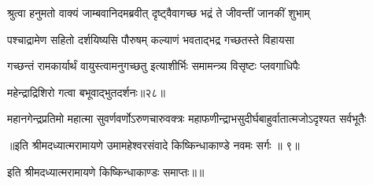\twolineshloka
{श्रुत्वा हनुमतो वाक्यं जाम्बवानिदमब्रवीत्}
{दृष्ट्वैवागच्छ भद्रं ते जीवन्तीं जानकीं शुभाम्} %

\twolineshloka
{पश्चाद्रामेण सहितो दर्शयिष्यसि पौरुषम्}
{कल्याणं भवताद्भद्र गच्छतस्ते विहायसा} %

\twolineshloka
{गच्छन्तं रामकार्यार्थं वायुस्त्वामनुगच्छतु}
{इत्याशीर्भिः समामन्त्र्य विसृष्टः प्लवगाधिपैः} %

{महेन्द्राद्रिशिरो गत्वा बभूवाद्भुतदर्शनः॥२८॥} %


\twolineshloka
{महानगेन्द्रप्रतिमो महात्मा सुवर्णवर्णोऽरुणचारुवक्त्रः}
{महाफणीन्द्राभसुदीर्घबाहुर्वातात्मजोऽदृश्यत सर्वभूतैः} %

{॥इति श्रीमदध्यात्मरामायणे उमामहेश्वरसंवादे किष्किन्धाकाण्डे
नवमः सर्गः ॥ ९॥
}

इति श्रीमदध्यात्मरामायणे किष्किन्धाकाण्डः समाप्तः॥॥
